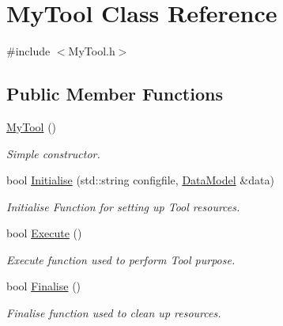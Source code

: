 \hypertarget{classMyTool}{
\section{MyTool Class Reference}
\label{classMyTool}
}


{\ttfamily \#include $<$MyTool.h$>$}\subsection*{Public Member Functions}
\begin{DoxyCompactItemize}
\item 
\hypertarget{classMyTool_ad85b796bdd675ae22e69cf40fe7b6314}{
\hyperlink{classMyTool_ad85b796bdd675ae22e69cf40fe7b6314}{MyTool} ()}
\label{classMyTool_ad85b796bdd675ae22e69cf40fe7b6314}

\begin{DoxyCompactList}\small\item\em Simple constructor. \item\end{DoxyCompactList}\item 
bool \hyperlink{classMyTool_a3bf60061195a18542c4cfb2916b9dad9}{Initialise} (std::string configfile, \hyperlink{classDataModel}{DataModel} \&data)
\begin{DoxyCompactList}\small\item\em Initialise Function for setting up Tool resources. \item\end{DoxyCompactList}\item 
\hypertarget{classMyTool_a0a58122023af90b9200d0e71e89cfb36}{
bool \hyperlink{classMyTool_a0a58122023af90b9200d0e71e89cfb36}{Execute} ()}
\label{classMyTool_a0a58122023af90b9200d0e71e89cfb36}

\begin{DoxyCompactList}\small\item\em Execute function used to perform Tool purpose. \item\end{DoxyCompactList}\item 
\hypertarget{classMyTool_a060ec6356451aa335d0de41093c9992f}{
bool \hyperlink{classMyTool_a060ec6356451aa335d0de41093c9992f}{Finalise} ()}
\label{classMyTool_a060ec6356451aa335d0de41093c9992f}

\begin{DoxyCompactList}\small\item\em Finalise function used to clean up resources. \item\end{DoxyCompactList}\end{DoxyCompactItemize}


